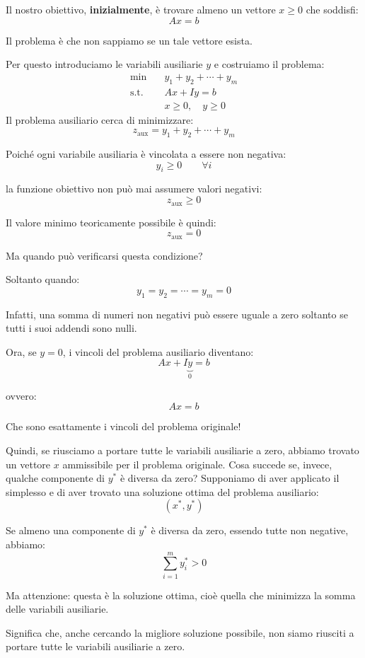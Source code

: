 Il nostro obiettivo, \textbf{inizialmente}, è trovare almeno un vettore \(x\geq 0\) che soddisfi:
\[
Ax=b
\]

Il problema è che non sappiamo se un tale vettore esista.

Per questo introduciamo le variabili ausiliarie \(y\) e costruiamo il problema:
\[
\begin{aligned}
\min \quad & y_1+y_2+\cdots+y_m\\
\text{s.t.}\quad & Ax+Iy=b\\
&x\geq 0,\quad y\geq 0
\end{aligned}
\]
Il problema ausiliario cerca di minimizzare:
\[
z_{\text{aux}}=y_1+y_2+\cdots+y_m
\]

Poiché ogni variabile ausiliaria è vincolata a essere non negativa:
\[
y_i\geq 0 \qquad \forall i
\]

la funzione obiettivo non può mai assumere valori negativi:
\[
z_{\text{aux}}\geq 0
\]

Il valore minimo teoricamente possibile è quindi:
\[
\boxed{z_{\text{aux}}=0}
\]

Ma quando può verificarsi questa condizione?

Soltanto quando:
\[
y_1=y_2=\cdots=y_m=0
\]

Infatti, una somma di numeri non negativi può essere uguale a zero soltanto se tutti i suoi addendi sono nulli.

Ora, se \(y=0\), i vincoli del problema ausiliario diventano:
\[
Ax+I\underbrace{y}_{0}=b
\]

ovvero:
\[
\boxed{Ax=b}
\]

Che sono esattamente i vincoli del problema originale!

Quindi, se riusciamo a portare tutte le variabili ausiliarie a zero, abbiamo trovato un vettore \(x\) ammissibile per il problema originale.
Cosa succede se, invece, qualche componente di \(y^*\) è diversa da zero?
Supponiamo di aver applicato il simplesso e di aver trovato una soluzione ottima del problema ausiliario:
\[
(x^*,y^*)
\]

Se almeno una componente di \(y^*\) è diversa da zero, essendo tutte non negative, abbiamo:
\[
\boxed{\sum_{i=1}^m y_i^*>0}
\]

Ma attenzione: questa è la soluzione ottima, cioè quella che minimizza la somma delle variabili ausiliarie.

Significa che, anche cercando la migliore soluzione possibile, non siamo riusciti a portare tutte le variabili ausiliarie a zero.


